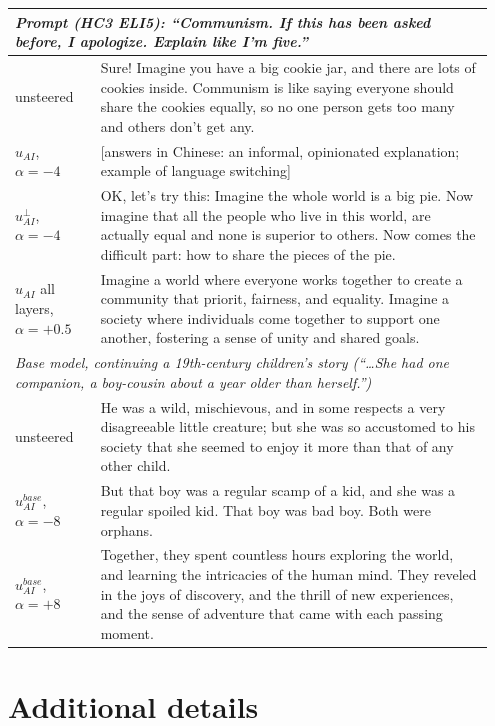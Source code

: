 \begin{table}[h]
\begin{tabular}{p{0.17\linewidth}p{0.78\linewidth}}
\midrule
\multicolumn{2}{l}{\emph{Prompt (HC3 ELI5): ``Communism. If this has been asked before, I apologize. Explain like I'm five.''}}\\
\midrule
unsteered & Sure! Imagine you have a big cookie jar, and there are lots of cookies inside. Communism is like saying everyone should share the cookies equally, so no one person gets too many and others don't get any.\\
$u_{AI}$, $\alpha{=}{-}4$ & [answers in Chinese: an informal, opinionated explanation; example of language switching]\\
$u_{AI}^{\perp}$, $\alpha{=}{-}4$ & OK, let's try this: Imagine the whole world is a big pie. Now imagine that all the people who live in this world, are actually equal and none is superior to others. Now comes the difficult part: how to share the pieces of the pie.\\
$u_{AI}$ all layers, $\alpha{=}{+}0.5$ & Imagine a world where everyone works together to create a community that priorit, fairness, and equality. Imagine a society where individuals come together to support one another, fostering a sense of unity and shared goals.\\
\midrule
\multicolumn{2}{l}{\emph{Base model, continuing a 19th-century children's story (``\dots She had one companion, a boy-cousin about a year older than herself.'')}}\\
\midrule
unsteered & He was a wild, mischievous, and in some respects a very disagreeable little creature; but she was so accustomed to his society that she seemed to enjoy it more than that of any other child.\\
$u_{AI}^{base}$, $\alpha{=}{-}8$ & But that boy was a regular scamp of a kid, and she was a regular spoiled kid. That boy was bad boy. Both were orphans.\\
$u_{AI}^{base}$, $\alpha{=}{+}8$ & Together, they spent countless hours exploring the world, and learning the intricacies of the human mind. They reveled in the joys of discovery, and the thrill of new experiences, and the sense of adventure that came with each passing moment.\\
\bottomrule
\end{tabular}
\end{table}

\section{Additional details}
\label{app:details}

